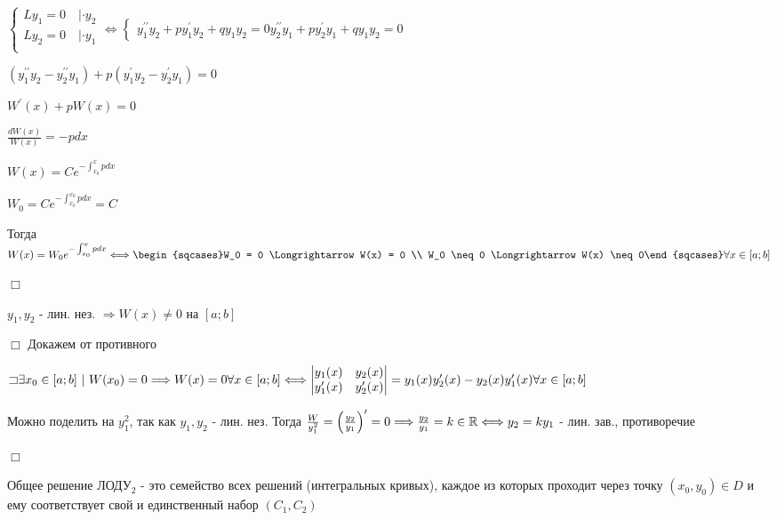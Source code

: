 \documentclass[12pt]{article}
\begin{document}
    $\begin{cases}
        Ly_1 = 0 \quad | \cdot y_2 \\
        Ly_2 = 0 \quad | \cdot y_1 \\
    \end{cases} \Longleftrightarrow
    \begin{cases}
        y_1^{\prime\prime} y_2 + py_1^{\prime} y_2 + q y_1 y_2 = 0
        y_2^{\prime\prime} y_1 + py_2^{\prime} y_1 + q y_1 y_2 = 0
    \end{cases}$

    $(y_1^{\prime\prime} y_2 - y_2^{\prime\prime} y_1) + p (y_1^{\prime} y_2 - y_2^{\prime} y_1) = 0$

    $W^\prime(x) + pW(x) = 0$

    $\frac{dW(x)}{W(x)} = -pdx$

    $W(x) = Ce^{-\int_{x_0}^x pdx}$

    $W_0 = Ce^{-\int^{x_0}_{x_0} pdx} = C$

    Тогда $W(x) = W_0 e^{-\int_{x_0}^x pdx} \Longleftrightarrow \begin{sqcases}W_0 = 0 \Longrightarrow W(x) = 0 \\ W_0 \neq 0 \Longrightarrow W(x) \neq 0\end{sqcases} \forall x \in [a;b]$

    $\Box$

     $y_1, y_2$ - лин. нез. $\Longrightarrow W(x) \neq 0$ на $[a;b]$

    $\Box$ Докажем от противного

    $\letsymbol \exists x_0 \in [a;b] \ | \ W(x_0)= 0 \Longrightarrow W(x) = 0 \forall x \in [a;b] \Longleftrightarrow
    \begin{vmatrix}y_1(x) & y_2(x) \\ y_1^\prime(x) & y_2^\prime(x)\end{vmatrix} = y_1(x) y_2^\prime(x) - y_2(x) y_1^\prime(x) \forall x \in [a;b]$

    Можно поделить на $y_1^2$, так как $y_1, y_2$ - лин. нез. Тогда $\frac{W}{y^2_1} = \left(\frac{y_2}{y_1}\right)^\prime = 0 \Longrightarrow \frac{y_2}{y_1} = k \in \mathbb{R} \Longleftrightarrow y_2 = k y_1$ - лин. зав., противоречие

    $\Box$

    \Nota Общее решение ЛОДУ$_2$ - это семейство всех решений (интегральных кривых), каждое из которых проходит через точку
    $(x_0, y_0) \in D$ и ему соответствует свой и единственный набор $(C_1, C_2)$
\end{document}

